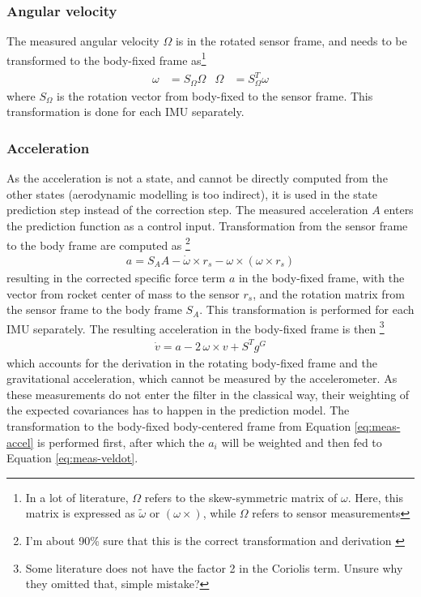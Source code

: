\subsubsection{Angular velocity}
The measured angular velocity $\Omega$ is in the rotated sensor frame, and needs to be transformed to the  body-fixed frame as\footnote{In a lot of literature, $\Omega$ refers to the skew-symmetric matrix of $\omega$. Here, this matrix is expressed as $\tilde \omega$ or $(\omega \times)$, while $\Omega$ refers to sensor measurements}
\begin{align}
    \omega &= S_\Omega \hat \Omega & \hat \Omega &= S_\Omega^T \omega
    \label{eq:meas-gyro}
\end{align}
where $S_\Omega$ is the rotation vector from body-fixed to the sensor frame.
This transformation is done for each IMU separately.

\subsubsection{Acceleration}
As the acceleration is not a state, and cannot be directly computed from the other states (aerodynamic modelling is too indirect), it is used in the state prediction step instead of the correction step. 
The measured acceleration $A$ enters the prediction function as a control input.
Transformation from the sensor frame to the body frame are computed as \cite{stevens2015} \footnote{I'm about 90\% sure that this is the correct transformation and derivation \label{footnote:measure-accel}}
\begin{align}
    a = S_A A - \dot \omega \times r_s - \omega \times (\omega \times r_s)
    \label{eq:meas-accel}
\end{align}
resulting in the corrected specific force term $a$ in the body-fixed frame, with the vector from rocket center of mass to the sensor $r_s$, and the rotation matrix from the sensor frame to the body frame $S_A$.
This transformation is performed for each IMU separately.
The resulting acceleration in the body-fixed frame is then \cite{zipfel2007, stevens2015} \footnote{Some literature \cite{zipfel2007} does not have the factor 2 in the Coriolis term. Unsure why they omitted that, simple mistake?}
\begin{align}
    \dot v = a - 2 \, \omega \times v + S^T g^G
    \label{eq:meas-veldot}
\end{align}
which accounts for the derivation in the rotating body-fixed frame and the gravitational acceleration, which cannot be measured by the accelerometer. 
As these measurements do not enter the filter in the classical way, their weighting of the expected covariances has to happen in the prediction model.
The transformation to the body-fixed body-centered frame from Equation \ref{eq:meas-accel} is performed first, after which the $a_i$ will be weighted and then fed to Equation \ref{eq:meas-veldot}.

